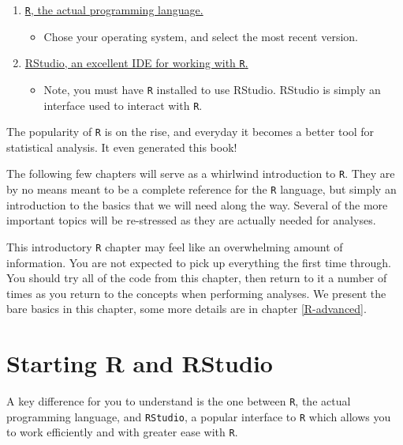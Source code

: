 \documentclass[]{book}
\providecommand{\tightlist}{%
  \setlength{\itemsep}{0pt}\setlength{\parskip}{0pt}}
\theoremstyle{definition}
\theoremstyle{definition}
\theoremstyle{definition}
\theoremstyle{remark}
\begin{document}
\begin{enumerate}
\def\labelenumi{\arabic{enumi}.}
\tightlist
\item
  \href{https://www.r-project.org}{\texttt{R}, the actual programming
  language.}

  \begin{itemize}
  \tightlist
  \item
    Chose your operating system, and select the most recent version.
  \end{itemize}
\item
  \href{http://www.rstudio.com/}{RStudio, an excellent IDE for working
  with \texttt{R}.}

  \begin{itemize}
  \tightlist
  \item
    Note, you must have \texttt{R} installed to use RStudio. RStudio is
    simply an interface used to interact with \texttt{R}.
  \end{itemize}
\end{enumerate}

The popularity of \texttt{R} is on the rise, and everyday it becomes a
better tool for statistical analysis. It even generated this book!

The following few chapters will serve as a whirlwind introduction to
\texttt{R}. They are by no means meant to be a complete reference for
the \texttt{R} language, but simply an introduction to the basics that
we will need along the way. Several of the more important topics will be
re-stressed as they are actually needed for analyses.

This introductory \texttt{R} chapter may feel like an overwhelming
amount of information. You are not expected to pick up everything the
first time through. You should try all of the code from this chapter,
then return to it a number of times as you return to the concepts when
performing analyses. We present the bare basics in this chapter, some
more details are in chapter \ref{R-advanced}.

\section{Starting R and RStudio}\label{starting-r-and-rstudio}

A key difference for you to understand is the one between \texttt{R},
the actual programming language, and \texttt{RStudio}, a popular
interface to \texttt{R} which allows you to work efficiently and with
greater ease with \texttt{R}.
\end{document}
